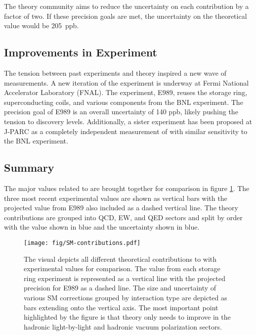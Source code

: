 The theory community aims to reduce the uncertainty on each contribution by a factor of two.  If these precision goals are met, the uncertainty on the theoretical value would be \SI{205}{ppb}.

\subsection{Improvements in Experiment}
The tension between past experiments and theory inspired a new wave of \mugmtwo measurements.  A new iteration of the \mugmtwo experiment is underway at Fermi National Accelerator Laboratory (FNAL). The experiment, E989, reuses the storage ring, superconducting coils, and various components from the BNL experiment.  The precision goal of E989 is an overall uncertainty of 140 ppb, likely pushing the tension to discovery levels. Additionally, a sister experiment has been proposed at J-PARC as a completely independent measurement of \mugmtwo with similar sensitivity to the BNL experiment.

\subsection{Summary}
The major values related to \mugmtwo are brought together for comparison in figure \ref{fig:sm-contributions}.  The three most recent experimental values are shown as vertical bars with the projected value from E989 also included as a dashed vertical line.  The theory contributions are grouped into QCD, EW, and QED sectors and split by order with the value shown in blue and the uncertainty shown in blue.

\begin{figure}
\label{fig:sm-contributions}
\centering
\texttt{[image: fig/SM-contributions.pdf]}
\caption{The visual depicts all different theoretical contributions to \mugmtwo with experimental values for comparison.  The value from each storage ring experiment is represented as a vertical line with the projected precision for E989 as a dashed line.  The size and uncertainty of various SM corrections grouped by interaction type are depicted as bars extending onto the vertical axis. The most important point highlighted by the figure is that theory only needs to improve in the hadronic light-by-light and hadronic vacuum polarization sectors.}
\end{figure}
